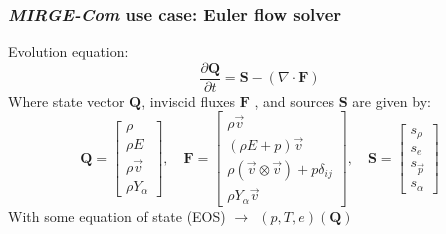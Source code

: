 \begin{frame}\frametitle{\textit{MIRGE-Com} use case: Euler flow solver}
  \begin{center}
    Evolution equation:
    \begin{equation*}
      \frac{\partial\mathbf{Q}}{\partial{t}} = \mathbf{S} - (\nabla \cdot \mathbf{F}) 
    \end{equation*}
    Where state vector $\mathbf{Q}$, inviscid fluxes $\mathbf{F}$ , and sources $\mathbf{S}$ are given by:
    \begin{equation*}
      \mathbf{Q} = \begin{bmatrix}
        \rho\\\rho{E}\\\rho\vec{v}\\\rho{Y}_\alpha\end{bmatrix},\quad
      \mathbf{F} = \begin{bmatrix} \rho\vec{v}\\(\rho{E} +
        p)\vec{v}\\\rho(\vec{v} \otimes \vec{v}) +
        p\delta_{ij}\\\rho{Y}_\alpha\vec{v}\end{bmatrix}, \quad \mathbf{S} = \begin{bmatrix} s_\rho\\s_e\\s_{\vec{p}}\\s_{\alpha}\end{bmatrix}
    \end{equation*}
    With some equation of state (EOS) $\rightarrow~~(p,T,e)(\mathbf{Q})$
  \end{center}
\end{frame}


